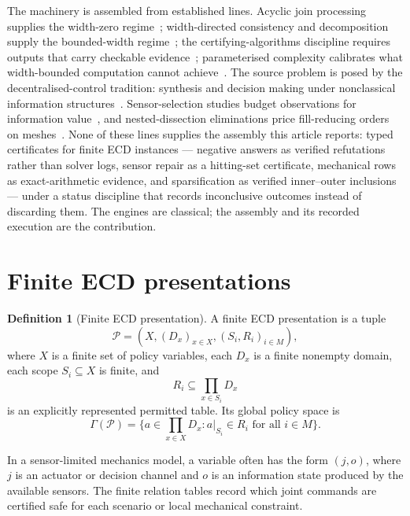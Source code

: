 \documentclass[11pt]{article}
\theoremstyle{plain}
\theoremstyle{definition}
\newtheorem{definition}[theorem]{Definition}
\theoremstyle{remark}
\begin{document}
The machinery is assembled from established lines.  Acyclic join processing
supplies the width-zero regime~\cite{yannakakis81}; width-directed consistency
and decomposition supply the bounded-width
regime~\cite{freuder82,dechter03,bodlaender-koster08}; the
certifying-algorithms discipline requires outputs that carry checkable
evidence~\cite{mcm11}; parameterised complexity calibrates what width-bounded
computation cannot achieve~\cite{downey-fellows99,impagliazzo-paturi01}.
The source problem is posed by the decentralised-control tradition: synthesis
and decision making under nonclassical information
structures~\cite{witsenhausen71,papadimitrioutsitsiklis86,bernstein02}.
Sensor-selection studies budget observations for information
value~\cite{krauseguestrin07}, and nested-dissection eliminations price
fill-reducing orders on meshes~\cite{george73,liptontarjan79}.  None of these
lines supplies the assembly this article reports: typed certificates for
finite ECD instances --- negative answers as verified refutations rather than
solver logs, sensor repair as a hitting-set certificate, mechanical rows as
exact-arithmetic evidence, and sparsification as verified inner--outer
inclusions --- under a status discipline that records inconclusive outcomes
instead of discarding them.  The engines are classical; the assembly and its
recorded execution are the contribution.

\section{Finite ECD presentations}
\label{sec:finite-presentations}

\begin{definition}[Finite ECD presentation]
A finite ECD presentation is a tuple
\[
  \mathcal P=(X,(D_x)_{x\in X},(S_i,R_i)_{i\in M}),
\]
where \(X\) is a finite set of policy variables, each \(D_x\) is a finite
nonempty domain, each scope \(S_i\subseteq X\) is finite, and
\[
  R_i\subseteq\prod_{x\in S_i}D_x
\]
is an explicitly represented permitted table.  Its global policy space is
\[
  \Gamma(\mathcal P)=
  \{a\in\prod_{x\in X}D_x: a|_{S_i}\in R_i\text{ for all }i\in M\}.
\]
\end{definition}

In a sensor-limited mechanics model, a variable often has the form \((j,o)\),
where \(j\) is an actuator or decision channel and \(o\) is an information state
produced by the available sensors.  The finite relation tables record which
joint commands are certified safe for each scenario or local mechanical
constraint.
\end{document}
